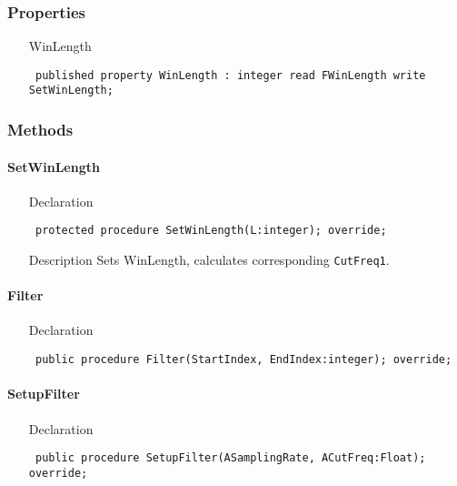 \documentclass[12pt,a4paper,oneside]{report}
\newcommand{\declarationitem}[1]{{\addfontfeatures{FakeBold=1.3} #1}}
\newcommand{\descriptiontitle}[1]{{\addfontfeatures{FakeSlant}#1}}
\newcommand{\code}[1]{\texttt{#1}}
\begin{document}
\subsubsection{Properties}
\begin{itemize}\label{lmfilters.TMovAvFilter-WinLength}
	\item[\declarationitem{WinLength}\hfill]
	\begin{flushleft}
		\code{
			published property WinLength : integer read FWinLength write SetWinLength;}
	\end{flushleft}
 \end{itemize}
\subsubsection{Methods}
\paragraph{SetWinLength}
\label{lmfilters.TMovAvFilter-SetWinLength}
\begin{itemize}\item[\declarationitem{Declaration}\hfill]
	\begin{flushleft}
		\code{
			protected procedure SetWinLength(L:integer); override;}
	\end{flushleft}
\item[\descriptiontitle{Description}] Sets WinLength, calculates corresponding \code{CutFreq1}.
\end{itemize}
\paragraph{Filter}\hspace*{\fill}
\label{lmfilters.TMovAvFilter-Filter}
\begin{itemize}\item[\declarationitem{Declaration}\hfill]
	\begin{flushleft}
		\code{
			public procedure Filter(StartIndex, EndIndex:integer); override;}
	\end{flushleft}
\end{itemize}
\paragraph{SetupFilter}\hspace*{\fill}
\label{lmfilters.TMovAvFilter-SetupFilter}
\begin{itemize}\item[\declarationitem{Declaration}\hfill]
	\begin{flushleft}
		\code{
			public procedure SetupFilter(ASamplingRate, ACutFreq:Float); override;}
	\end{flushleft}
\end{itemize}
\end{document}
